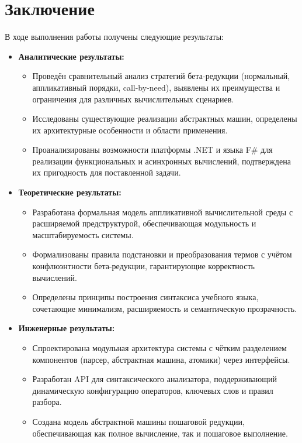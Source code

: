 \chapter*{Заключение}

В ходе выполнения работы получены следующие результаты:

\begin{itemize}
    \item \textbf{Аналитические результаты:}
    \begin{itemize}
        \item Проведён сравнительный анализ стратегий бета-редукции (нормальный, аппликативный порядки, call-by-need), выявлены их преимущества и ограничения для различных вычислительных сценариев.
        \item Исследованы существующие реализации абстрактных машин, определены их архитектурные особенности и области применения.
        \item Проанализированы возможности платформы .NET и языка F\# для реализации функциональных и асинхронных вычислений, подтверждена их пригодность для поставленной задачи.
    \end{itemize}

    \item \textbf{Теоретические результаты:}
    \begin{itemize}
        \item Разработана формальная модель аппликативной вычислительной среды с расширяемой предструктурой, обеспечивающая модульность и масштабируемость системы.
        \item Формализованы правила подстановки и преобразования термов с учётом конфлюэнтности бета-редукции, гарантирующие корректность вычислений.
        \item Определены принципы построения синтаксиса учебного языка, сочетающие минимализм, расширяемость и семантическую прозрачность.
    \end{itemize}

    \item \textbf{Инженерные результаты:}
    \begin{itemize}
        \item Спроектирована модульная архитектура системы с чётким разделением компонентов (парсер, абстрактная машина, атомики) через интерфейсы.
        \item Разработан API для синтаксического анализатора, поддерживающий динамическую конфигурацию операторов, ключевых слов и правил разбора.
        \item Создана модель абстрактной машины пошаговой редукции, обеспечивающая как полное вычисление, так и пошаговое выполнение.
    \end{itemize}


\end{itemize}
